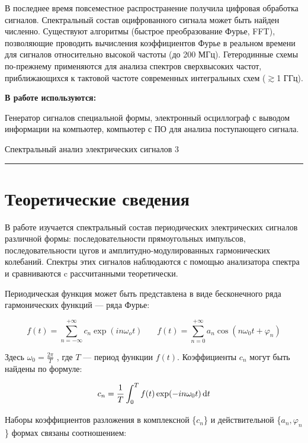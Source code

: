 \documentclass[12pt,a4paper]{scrartcl}
\begin{document}
	В последнее время повсеместное распространение получила цифровая обработка сигналов. Спектральный состав оцифрованного сигнала может быть найден численно. Существуют алгоритмы (быстрое преобразование Фурье, FFT), позволяющие проводить вычисления коэффициентов Фурье в реальном времени для сигналов относительно высокой	частоты (до 200 МГц). Гетеродинные схемы по-прежнему применяются для анализа спектров сверхвысоких частот, приближающихся к тактовой частоте современных интегральных схем ($\gtrsim$1 ГГц).
		
	\textbf{В работе используются:}
	
	Генератор сигналов специальной формы, электронный осциллограф с выводом информации на компьютер, компьютер с ПО для анализа поступающего сигнала.
	
	\newpage
	
	
	\begin{flushleft}
		\footnotesize{Спектральный анализ электрических сигналов} \hspace{\fill} \footnotesize{3}
		\\[-0.3cm]\noindent\rule{\textwidth}{0.3pt}
	\end{flushleft}
	
	\section{Теоретические сведения}
	
	В работе изучается спектральный состав периодических электрических сигналов различной формы: последовательности прямоугольных импульсов, последовательности цугов и амплитудно-модулированных гармонических колебаний. Спектры этих сигналов наблюдаются с помощью анализатора спектра и сравниваются c рассчитанными теоретически.
	
	Периодическая функция может быть представлена в виде бесконечного ряда гармонических функций — ряда Фурье:
	
	$$f(t) = \sum_{n = -\infty}^{+\infty} c_n\exp(i n \omega_o t) \ \ \ \ \ \ \ \ f(t) = \sum_{n = 0}^{+\infty} a_n \cos (n \omega_0 t + \varphi_n)$$
	
	Здесь $\omega_0 = \frac{2\pi}{T}$ , где $T$ — период функции $f(t)$. Коэффициенты {$c_n$} могут быть найдены по формуле:
	
	$$c_n = \dfrac{\strut 1}{\strut T} \int_{0}^{T} f(t) \exp(-i n \omega_0 t)\, \mathrm{d} t$$
	
	Наборы коэффициентов разложения в комплексной \{$c_n$\} и действительной \{$a_n, \varphi_n$\} формах связаны соотношением:
	
\end{document}

